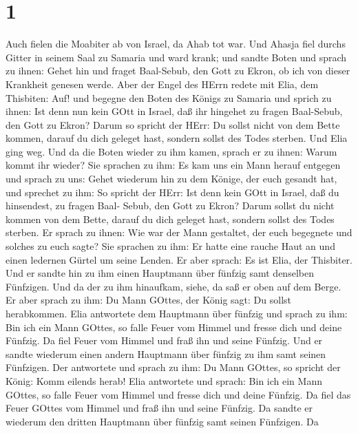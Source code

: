 \hypertarget{section}{%
\section{1}\label{section}}

 Auch fielen die Moabiter ab von Israel, da Ahab tot war.
 Und Ahasja fiel durchs Gitter in seinem Saal zu Samaria und
ward krank; und sandte Boten und sprach zu ihnen: Gehet hin und fraget
Baal-Sebub, den Gott zu Ekron, ob ich von dieser Krankheit genesen
werde.  Aber der Engel des HErrn redete mit Elia, dem
Thisbiten: Auf! und begegne den Boten des Königs zu Samaria und sprich
zu ihnen: Ist denn nun kein GOtt in Israel, daß ihr hingehet zu fragen
Baal-Sebub, den Gott zu Ekron?  Darum so spricht der HErr:
Du sollst nicht von dem Bette kommen, darauf du dich geleget hast,
sondern sollst des Todes sterben. Und Elia ging weg.  Und da
die Boten wieder zu ihm kamen, sprach er zu ihnen: Warum kommt ihr
wieder?  Sie sprachen zu ihm: Es kam uns ein Mann herauf
entgegen und sprach zu uns: Gehet wiederum hin zu dem Könige, der euch
gesandt hat, und sprechet zu ihm: So spricht der HErr: Ist denn kein
GOtt in Israel, daß du hinsendest, zu fragen Baal- Sebub, den Gott zu
Ekron? Darum sollst du nicht kommen von dem Bette, darauf du dich
geleget hast, sondern sollst des Todes sterben.  Er sprach
zu ihnen: Wie war der Mann gestaltet, der euch begegnete und solches zu
euch sagte?  Sie sprachen zu ihm: Er hatte eine rauche Haut
an und einen ledernen Gürtel um seine Lenden. Er aber sprach: Es ist
Elia, der Thisbiter.  Und er sandte hin zu ihm einen
Hauptmann über fünfzig samt denselben Fünfzigen. Und da der zu ihm
hinaufkam, siehe, da saß er oben auf dem Berge. Er aber sprach zu ihm:
Du Mann GOttes, der König sagt: Du sollst herabkommen. 
Elia antwortete dem Hauptmann über fünfzig und sprach zu ihm: Bin ich
ein Mann GOttes, so falle Feuer vom Himmel und fresse dich und deine
Fünfzig. Da fiel Feuer vom Himmel und fraß ihn und seine Fünfzig.
 Und er sandte wiederum einen andern Hauptmann über fünfzig
zu ihm samt seinen Fünfzigen. Der antwortete und sprach zu ihm: Du Mann
GOttes, so spricht der König: Komm eilends herab!  Elia
antwortete und sprach: Bin ich ein Mann GOttes, so falle Feuer vom
Himmel und fresse dich und deine Fünfzig. Da fiel das Feuer GOttes vom
Himmel und fraß ihn und seine Fünfzig.  Da sandte er
wiederum den dritten Hauptmann über fünfzig samt seinen Fünfzigen. Da
